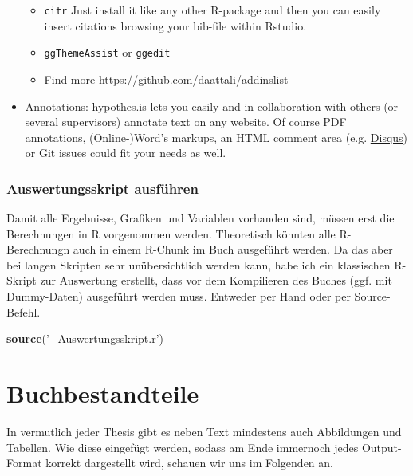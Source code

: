 \documentclass[]{book}
\makeatletter
\newenvironment{Shaded}{\begin{snugshade}}{\end{snugshade}}
\newcommand{\KeywordTok}[1]{\textcolor[rgb]{0.13,0.29,0.53}{\textbf{{#1}}}}
\newcommand{\StringTok}[1]{\textcolor[rgb]{0.31,0.60,0.02}{{#1}}}
\newcommand{\NormalTok}[1]{{#1}}
\providecommand{\tightlist}{%
  \setlength{\itemsep}{0pt}\setlength{\parskip}{0pt}}
\newenvironment{kframe}{%
\medskip{}
\setlength{\fboxsep}{.8em}
 \def\at@end@of@kframe{}%
 \ifinner\ifhmode%
  \def\at@end@of@kframe{\end{minipage}}%
  \begin{minipage}{\columnwidth}%
 \fi\fi%
 \def\FrameCommand##1{\hskip\@totalleftmargin \hskip-\fboxsep
 \colorbox{shadecolor}{##1}\hskip-\fboxsep
     \hskip-\linewidth \hskip-\@totalleftmargin \hskip\columnwidth}%
 \MakeFramed {\advance\hsize-\width
   \@totalleftmargin\z@ \linewidth\hsize
   \@setminipage}}%
 {\par\unskip\endMakeFramed%
 \at@end@of@kframe}
\renewenvironment{Shaded}{\begin{kframe}}{\end{kframe}}
\theoremstyle{definition}
\theoremstyle{definition}
\theoremstyle{remark}
\makeatother
\begin{document}
\begin{itemize}
  \begin{itemize}
  \tightlist
  \item
    \texttt{citr} Just install it like any other R-package and then you
    can easily insert citations browsing your bib-file within Rstudio.
  \item
    \texttt{ggThemeAssist} or \texttt{ggedit}
  \item
    Find more \url{https://github.com/daattali/addinslist}
  \end{itemize}
\item
  Annotations: \href{https://web.hypothes.is/}{hypothes.is} lets you
  easily and in collaboration with others (or several supervisors)
  annotate text on any website. Of course PDF annotations,
  (Online-)Word's markups, an HTML comment area (e.g.
  \href{https://disqus.com/}{Disqus}) or Git issues could fit your needs
  as well.
\end{itemize}

\subsection*{Auswertungsskript
ausführen}\label{auswertungsskript-ausfuhren}

Damit alle Ergebnisse, Grafiken und Variablen vorhanden sind, müssen
erst die Berechnungen in R vorgenommen werden. Theoretisch könnten alle
R-Berechnungn auch in einem R-Chunk im Buch ausgeführt werden. Da das
aber bei langen Skripten sehr unübersichtlich werden kann, habe ich ein
klassischen R-Skript zur Auswertung erstellt, dass vor dem Kompilieren
des Buches (ggf. mit Dummy-Daten) ausgeführt werden muss. Entweder per
Hand oder per Source-Befehl.

\begin{Shaded}
\begin{Highlighting}[]
\KeywordTok{source}\NormalTok{(}\StringTok{'_Auswertungsskript.r'}\NormalTok{)}
\end{Highlighting}
\end{Shaded}

\chapter{Buchbestandteile}\label{components}

In vermutlich jeder Thesis gibt es neben Text mindestens auch
Abbildungen und Tabellen. Wie diese eingefügt werden, sodass am Ende
immernoch jedes Output-Format korrekt dargestellt wird, schauen wir uns
im Folgenden an.
\end{document}
